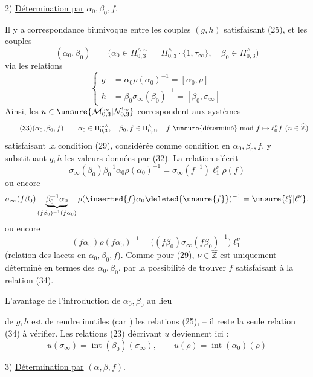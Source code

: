 
2) \uline{Détermination par} $\alpha_0,\beta_0,f$.

Il y a correspondance biunivoque entre les couples $(g,h)$ satisfaisant (25), et les couples
\[
\tag{31}
(\alpha_0,\beta_0)\qquad
\bigl(\alpha_0\in\Pi_{0,3}^{\wedge\sim}=\Pi_{0,3}^{\wedge}\cdot\{1,\tau_\infty\},\quad
\beta_0\in\Pi_{0,3}^{\wedge}\bigr)
\]
 via les relations
\[
\tag{32}
\left\{\begin{aligned}
g&=\alpha_0\rho(\alpha_0)^{-1}=[\alpha_0,\rho]\\
h&=\beta_0\sigma_\infty(\beta_0)^{-1}=[\beta_0,\sigma_\infty]
\end{aligned}\right.
\]
Ainsi, les $u\in\unsure{\mathcal{M}_{0,3}^{!\sim}|\mathcal{N}_{0,3}^{!\sim}}$ correspondent aux systèmes
\[
\tag{33}
(\alpha_0,\beta_0,f)\qquad
\alpha_0\in\Pi_{0,3}^{\sim\wedge},\quad\beta_0,f\in\Pi_{0,3}^{\wedge},\quad
f\ \text{\unsure{déterminé} mod }f\mapsto\ell_0^n f\ (n\in\widehat{\mathbb Z})
\]
satisfaisant la condition  (29), considérée comme condition en $\alpha_0,\beta_0,f$,  y substituant  $g,h$ les valeurs données par (32). La relation s'écrit
\[
\sigma_\infty(\beta_0)\beta_0^{-1}\alpha_0\rho(\alpha_0)^{-1}
=\sigma_\infty(f^{-1})\ell_1^\nu\rho(f)
\]
ou encore
\[
\sigma_\infty(f\beta_0)
\underbrace{\beta_0^{-1}\alpha_0}_{(f\beta_0)^{-1}(f\alpha_0)}
\rho(\inserted{f}\alpha_0\deleted{\unsure{f}})^{-1}
=\unsure{\ell_1^\nu|\ell^\nu}.
\]
ou encore
\[
\tag{34}
\boxed{(f\alpha_0)\rho(f\alpha_0)^{-1}
=\bigl((f\beta_0)\sigma_\infty(f\beta_0)^{-1}\bigr)\ell_1^\nu}
\]
(relation des lacets en $\alpha_0,\beta_0,f$). Comme pour (29), $\nu\in\widehat{\mathbb Z}$ est uniquement déterminé en termes des $\alpha_0,\beta_0$, par la possibilité de trouver $f$ satisfaisant à la relation (34).

L'avantage de l'introduction de $\alpha_0,\beta_0$ au lieu


de $g,h$ est de rendre inutiles (car ) les relations (25), -- il reste la seule relation (34) à vérifier. Les relations (23) décrivant $u$ deviennent ici :
\[
\tag{35}
u(\sigma_\infty)=\operatorname{int}(\beta_0)(\sigma_\infty),\qquad
u(\rho)=\operatorname{int}(\alpha_0)(\rho)
\]

3) \uline{Détermination par} $(\alpha,\beta,f)$.

